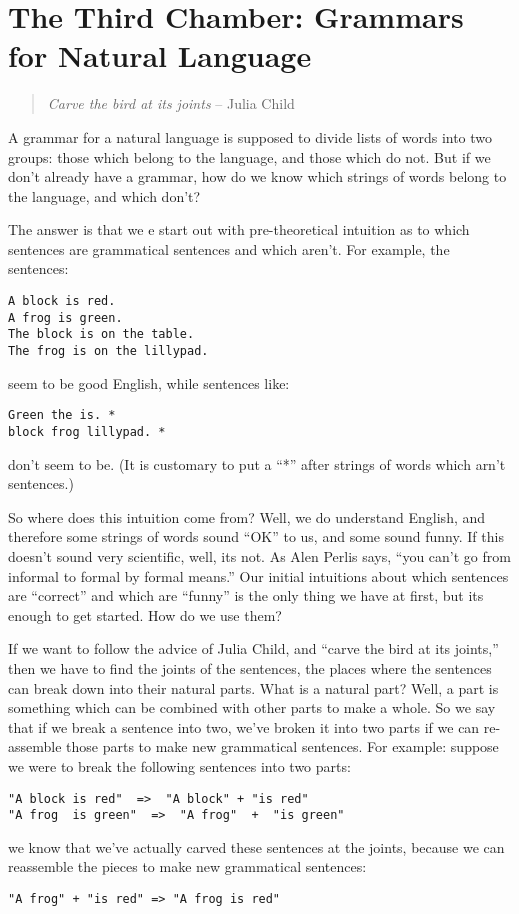 \documentclass{book}[9pt]
\begin{document}
\chapter{The Third Chamber: Grammars for Natural Language}

\begin{quote}
{\em Carve the bird at its joints} -- Julia Child
\end{quote}

A grammar for a natural language is supposed to divide lists of words
into two groups: those which belong to the language, and those which
do not.  But if we don't already have a grammar, how do we
know which strings of words belong to the language, and which
don't?

The answer is that we e start out with pre-theoretical intuition as to
which sentences are grammatical sentences and which aren't.  For
example, the sentences:
\begin{verbatim}
A block is red.
A frog is green.
The block is on the table.
The frog is on the lillypad.
\end{verbatim}
\noindent seem to be good English, while sentences like:
\begin{verbatim}
Green the is. *
block frog lillypad. *
\end{verbatim}
\noindent don't seem to be.  (It is customary to put a ``*'' after
strings of words which arn't sentences.)  

So where does this intuition come from?  Well, we do understand
English, and therefore some strings of words sound ``OK'' to us, and
some sound funny.  If this doesn't sound very scientific, well, its
not.  As Alen Perlis says, ``you can't go from informal to formal by
formal means.''  Our initial intuitions about which sentences are
``correct'' and which are ``funny'' is the only thing we have at
first, but its enough to get started.  How do we use them?

If we want to follow the advice of Julia Child, and ``carve the bird
at its joints,'' then we have to find the joints of the
sentences, the places where the sentences can break down into their
natural parts.  What is a natural part?  Well, a part is something
which can be combined with other parts to make a whole.  So we say
that if we break a sentence into two, we've broken it into two parts
if we can re-assemble those parts to make new grammatical sentences.
For example: suppose we were to break the following sentences into two
parts:
\begin{verbatim}
"A block is red"  =>  "A block" + "is red"
"A frog  is green"  =>  "A frog"  +  "is green"
\end{verbatim}
\noindent we know that we've actually carved these sentences at the joints, because
we can reassemble the pieces to make new grammatical sentences:
\begin{verbatim}
"A frog" + "is red" => "A frog is red"
\end{verbatim}
\end{document}
